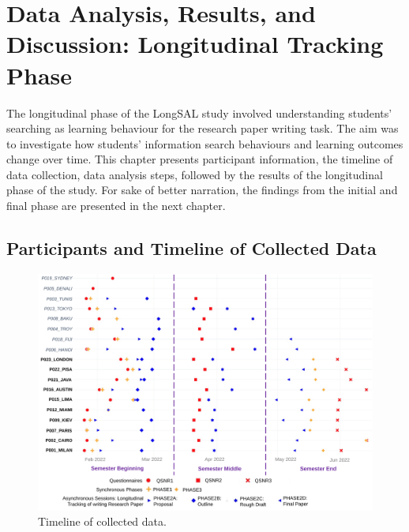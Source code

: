 \documentclass[letterpaper, nobind]{templates/ociamthesis}
\begin{document}
\hypertarget{data-analysis-results-and-discussion-longitudinal-tracking-phase}{%
\chapter{Data Analysis, Results, and Discussion: Longitudinal Tracking Phase}\label{data-analysis-results-and-discussion-longitudinal-tracking-phase}}

The longitudinal phase of the LongSAL study involved understanding students' searching as learning behaviour for the research paper writing task.
The aim was to investigate how students' information search behaviours and learning outcomes change over time.
This chapter presents participant information, the timeline of data collection, data analysis steps, followed by the results of the longitudinal phase of the study.
For sake of better narration, the findings from the initial and final phase are presented in the next chapter.

\hypertarget{participants-and-timeline-of-collected-data}{%
\section{Participants and Timeline of Collected Data}\label{participants-and-timeline-of-collected-data}}

\begin{figure}

{\centering \includegraphics[width=1\linewidth]{figs/res-timeline-collected-data} 

}

\caption[Timeline of collected data.]{Timeline of collected data.}\label{fig:res-timeline-collected-data}
\end{figure}
\end{document}
